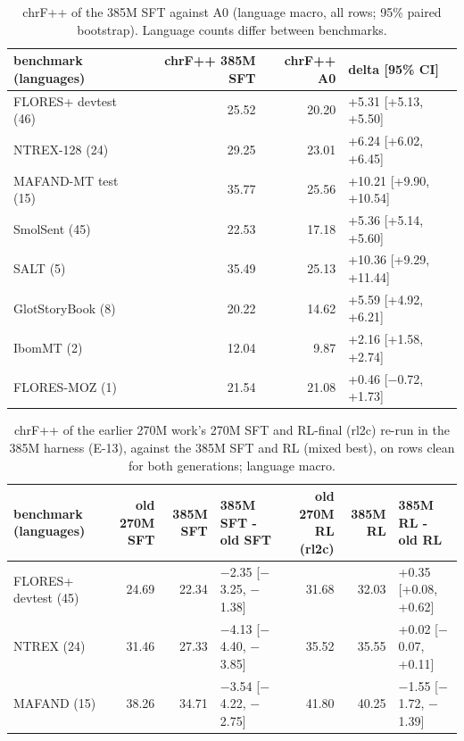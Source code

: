 \begin{table}[t]
\centering\small
\setlength{\tabcolsep}{4pt}
\caption{chrF++ of the 385M SFT against A0 (language macro, all rows; 95\% paired bootstrap). Language counts differ between benchmarks.}\label{tab:sft_a0}
\begin{tabularx}{\linewidth}{@{}lrr>{\raggedright\arraybackslash}X@{}}
\toprule
benchmark (languages) & chrF++ 385M SFT & chrF++ A0 & delta [95\% CI] \\
\midrule
FLORES+ devtest (46) & 25.52 & 20.20 & +5.31 [+5.13, +5.50] \\
NTREX-128 (24) & 29.25 & 23.01 & +6.24 [+6.02, +6.45] \\
MAFAND-MT test (15) & 35.77 & 25.56 & +10.21 [+9.90, +10.54] \\
SmolSent (45) & 22.53 & 17.18 & +5.36 [+5.14, +5.60] \\
SALT (5) & 35.49 & 25.13 & +10.36 [+9.29, +11.44] \\
GlotStoryBook (8) & 20.22 & 14.62 & +5.59 [+4.92, +6.21] \\
IbomMT (2) & 12.04 & 9.87 & +2.16 [+1.58, +2.74] \\
FLORES-MOZ (1) & 21.54 & 21.08 & +0.46 [\ensuremath{-}0.72, +1.73] \\
\bottomrule
\end{tabularx}
\end{table}

\begin{table}[t]
\centering\footnotesize
\setlength{\tabcolsep}{4pt}
\caption{chrF++ of the earlier 270M work's 270M SFT and RL-final (rl2c) re-run in the 385M harness (E-13), against the 385M SFT and RL (mixed best), on rows clean for both generations; language macro.}\label{tab:t_old270m}
\begin{tabularx}{\linewidth}{@{}>{\raggedright\arraybackslash}Xrrlrrl@{}}
\toprule
benchmark (languages) & old 270M SFT & 385M SFT & 385M SFT - old SFT & old 270M RL (rl2c) & 385M RL & 385M RL - old RL \\
\midrule
FLORES+ devtest (45) & 24.69 & 22.34 & \ensuremath{-}2.35 [\ensuremath{-}3.25, \ensuremath{-}1.38] & 31.68 & 32.03 & +0.35 [+0.08, +0.62] \\
NTREX (24) & 31.46 & 27.33 & \ensuremath{-}4.13 [\ensuremath{-}4.40, \ensuremath{-}3.85] & 35.52 & 35.55 & +0.02 [\ensuremath{-}0.07, +0.11] \\
MAFAND (15) & 38.26 & 34.71 & \ensuremath{-}3.54 [\ensuremath{-}4.22, \ensuremath{-}2.75] & 41.80 & 40.25 & \ensuremath{-}1.55 [\ensuremath{-}1.72, \ensuremath{-}1.39] \\
\bottomrule
\end{tabularx}
\end{table}

